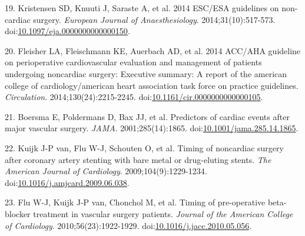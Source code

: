 \documentclass[]{article}
\begin{document}
\hypertarget{ref-Kristensen_2014}{}
19. Kristensen SD, Knuuti J, Saraste A, et al. 2014 ESC/ESA guidelines
on non-cardiac surgery. \emph{European Journal of Anaesthesiology}.
2014;31(10):517-573.
doi:\href{https://doi.org/10.1097/eja.0000000000000150}{10.1097/eja.0000000000000150}.

\hypertarget{ref-Fleisher_2014}{}
20. Fleisher LA, Fleischmann KE, Auerbach AD, et al. 2014 ACC/AHA
guideline on perioperative cardiovascular evaluation and management of
patients undergoing noncardiac surgery: Executive summary: A report of
the american college of cardiology/american heart association task force
on practice guidelines. \emph{Circulation}. 2014;130(24):2215-2245.
doi:\href{https://doi.org/10.1161/cir.0000000000000105}{10.1161/cir.0000000000000105}.

\hypertarget{ref-Boersma_2001}{}
21. Boersma E, Poldermans D, Bax JJ, et al. Predictors of cardiac events
after major vascular surgery. \emph{JAMA}. 2001;285(14):1865.
doi:\href{https://doi.org/10.1001/jama.285.14.1865}{10.1001/jama.285.14.1865}.

\hypertarget{ref-van_Kuijk_2009}{}
22. Kuijk J-P van, Flu W-J, Schouten O, et al. Timing of noncardiac
surgery after coronary artery stenting with bare metal or drug-eluting
stents. \emph{The American Journal of Cardiology}.
2009;104(9):1229-1234.
doi:\href{https://doi.org/10.1016/j.amjcard.2009.06.038}{10.1016/j.amjcard.2009.06.038}.

\hypertarget{ref-Flu_2010}{}
23. Flu W-J, Kuijk J-P van, Chonchol M, et al. Timing of pre-operative
beta-blocker treatment in vascular surgery patients. \emph{Journal of
the American College of Cardiology}. 2010;56(23):1922-1929.
doi:\href{https://doi.org/10.1016/j.jacc.2010.05.056}{10.1016/j.jacc.2010.05.056}.
\end{document}
